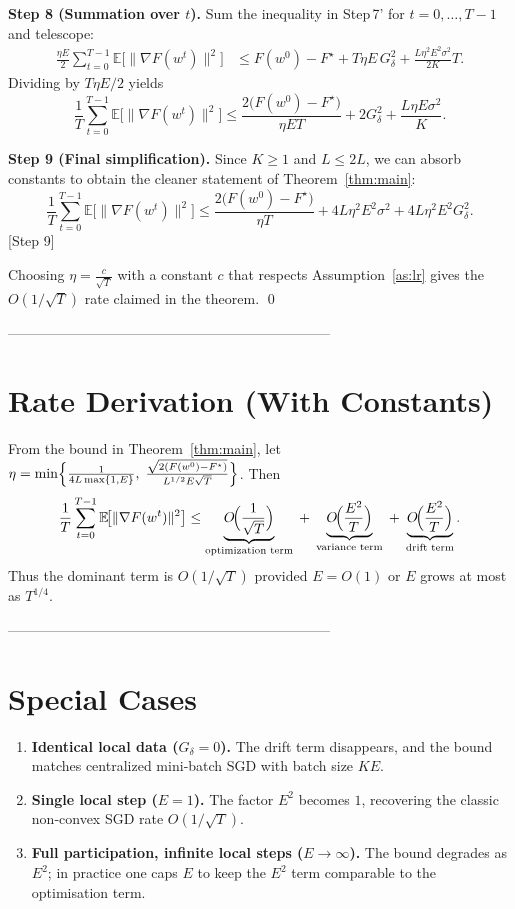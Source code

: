 \documentclass{article}
\newcommand{\EE}{\mathbb{E}}
\begin{document}
\noindent\textbf{Step 8 (Summation over $t$).}
Sum the inequality in Step 7' for $t=0,\dots,T-1$ and telescope:
\begin{align}
\frac{\eta E}{2}\sum_{t=0}^{T-1}\EE\!\bigl[\|\nabla F(w^{t})\|^{2}\bigr]
&\le F(w^{0})-F^{\star}
   +T\eta E\,G_{\delta}^{2}
   +\frac{L\eta^{2}E^{2}\sigma^{2}}{2K}T. \tag{Step 8}
\end{align}
Dividing by $T\eta E/2$ yields
\[
\frac1T\sum_{t=0}^{T-1}\EE\!\bigl[\|\nabla F(w^{t})\|^{2}\bigr]
\le \frac{2\bigl(F(w^{0})-F^{\star}\bigr)}{\eta ET}
   +2G_{\delta}^{2}
   +\frac{L\eta E\sigma^{2}}{K}. \tag{Step 8'}
\]

\noindent\textbf{Step 9 (Final simplification).}
Since $K\ge1$ and $L\le 2L$, we can absorb constants to obtain the cleaner
statement of Theorem~\ref{thm:main}:
\[
\frac1T\sum_{t=0}^{T-1}\EE\!\bigl[\|\nabla F(w^{t})\|^{2}\bigr]
\le
\frac{2\bigl(F(w^{0})-F^{\star}\bigr)}{\eta T}
+4L\eta^{2}E^{2}\sigma^{2}
+4L\eta^{2}E^{2}G_{\delta}^{2}.
\]
\hfill[Step 9]

Choosing $\eta = \frac{c}{\sqrt{T}}$ with a constant $c$ that respects
Assumption~\ref{as:lr} gives the $O(1/\sqrt{T})$ rate claimed in the theorem.
\qed

---------------------------------------------------------------------

\section*{Rate Derivation (With Constants)}
From the bound in Theorem~\ref{thm:main},
let $\eta = \min\Bigl\{\frac{1}{4L\max\{1,E\}},\;\frac{\sqrt{2(F(w^{0})-F^{\star})}}{L^{1/2}E\sqrt{T}}\Bigr\}$.
Then
\[
\frac1T\sum_{t=0}^{T-1}\EE\!\bigl[\|\nabla F(w^{t})\|^{2}\bigr]
\le
\underbrace{O\!\Bigl(\frac{1}{\sqrt{T}}\Bigr)}_{\text{optimization term}}
\;+\;
\underbrace{O\!\Bigl(\frac{E^{2}}{T}\Bigr)}_{\text{variance term}}
\;+\;
\underbrace{O\!\Bigl(\frac{E^{2}}{T}\Bigr)}_{\text{drift term}}.
\]
Thus the dominant term is $O(1/\sqrt{T})$ provided $E=O(1)$ or $E$ grows at most
as $T^{1/4}$.

---------------------------------------------------------------------

\section*{Special Cases}
\begin{enumerate}
\item \textbf{Identical local data ($G_{\delta}=0$).}
    The drift term disappears, and the bound matches centralized mini‑batch
    SGD with batch size $K\!E$.
\item \textbf{Single local step ($E=1$).}
    The factor $E^{2}$ becomes $1$, recovering the classic non‑convex SGD
    rate $O(1/\sqrt{T})$.
\item \textbf{Full participation, infinite local steps ($E\to\infty$).}
    The bound degrades as $E^{2}$; in practice one caps $E$ to keep the
    $E^{2}$ term comparable to the optimisation term.
\end{enumerate}
\end{document}
